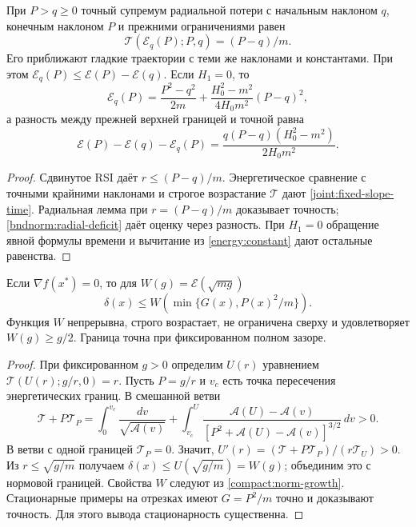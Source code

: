 \begin{proposition}
\label{joint:fixed-slope}
При $P>q\ge0$ точный супремум радиальной потери с начальным
наклоном $q$, конечным наклоном $P$ и прежними ограничениями равен
\begin{equation}\label{joint:fixed-slope-time}
 \mathcal T(\mathcal E_q(P);P,q)=(P-q)/m.
\end{equation}
Его приближают гладкие траектории с теми же наклонами и константами.
При этом $\mathcal E_q(P)\le\mathcal E(P)-\mathcal E(q)$.
Если $H_1=0$, то
\begin{equation}\label{joint:fixed-slope-constant}
 \mathcal E_q(P)=\frac{P^2-q^2}{2m}
       +\frac{H_0^2-m^2}{4H_0m^2}(P-q)^2,
\end{equation}
а разность между прежней верхней границей и точной равна
\[
 \mathcal E(P)-\mathcal E(q)-\mathcal E_q(P)
 =\frac{q(P-q)(H_0^2-m^2)}{2H_0m^2}.
\]
\end{proposition}
\begin{proof}
Сдвинутое RSI даёт $r\le(P-q)/m$.
Энергетическое сравнение с точными крайними наклонами и строгое
возрастание $\mathcal T$ дают \eqref{joint:fixed-slope-time}.
Радиальная лемма при $r=(P-q)/m$ доказывает точность;
\eqref{bndnorm:radial-deficit} даёт оценку через разность.
При $H_1=0$ обращение явной формулы времени и вычитание
из \eqref{energy:constant} дают остальные равенства.
\end{proof}

\begin{corollary}
\label{energy:gap}
Если $\nabla f(x^*)=0$, то для $W(g)=\mathcal E(\sqrt{mg})$
\begin{equation}\label{energy:gap-certificate}
 \delta(x)\le W\!\left(\min\{G(x),P(x)^2/m\}\right).
\end{equation}
Функция $W$ непрерывна, строго возрастает, не ограничена сверху
и удовлетворяет $W(g)\ge g/2$.
Граница точна при фиксированном полном зазоре.
\end{corollary}
\begin{proof}
При фиксированном $g>0$ определим $U(r)$ уравнением
$\mathcal T(U(r);g/r,0)=r$. Пусть $P=g/r$ и $v_c$ есть
точка пересечения энергетических границ. В смешанной ветви
\[
 \mathcal T+P\mathcal T_P
 =\int_0^{v_c}\frac{dv}{\sqrt{\mathcal A(v)}}
 +\int_{v_c}^{U}\frac{\mathcal A(U)-\mathcal A(v)}
 {[P^2+\mathcal A(U)-\mathcal A(v)]^{3/2}}\,dv>0.
\]
В ветви с одной границей $\mathcal T_P=0$.
Значит, $U'(r)=(\mathcal T+P\mathcal T_P)/(r\mathcal T_U)>0$.
Из $r\le\sqrt{g/m}$ получаем
$\delta(x)\le U(\sqrt{g/m})=W(g)$; объединим это с нормовой границей.
Свойства $W$ следуют из \eqref{compact:norm-growth}.
Стационарные примеры на отрезках имеют $G=P^2/m$ точно и
доказывают точность. Для этого вывода стационарность существенна.
\end{proof}
